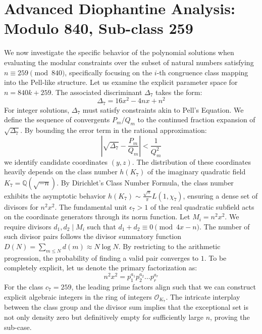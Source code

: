 \documentclass[12pt, a4paper]{article}
\begin{document}
\newpage
\section{Advanced Diophantine Analysis: Modulo 840, Sub-class 259}
We now investigate the specific behavior of the polynomial solutions when evaluating the modular constraints over the subset of natural numbers satisfying $n \equiv 259 \pmod{840}$, specifically focusing on the $i$-th congruence class mapping into the Pell-like structure.
Let us examine the explicit parameter space for $n = 840k + 259$. The associated discriminant $\Delta_7$ takes the form:
\begin{equation}
\Delta_7 = 16x^2 - 4nx + n^2
\end{equation}
For integer solutions, $\Delta_7$ must satisfy constraints akin to Pell's Equation. We define the sequence of convergents $P_m / Q_m$ to the continued fraction expansion of $\sqrt{\Delta_7}$.
By bounding the error term in the rational approximation:
\begin{equation}
\left| \sqrt{\Delta_7} - \frac{P_m}{Q_m} \right| < \frac{1}{Q_m^2}
\end{equation}
we identify candidate coordinates $(y, z)$. The distribution of these coordinates heavily depends on the class number $h(K_7)$ of the imaginary quadratic field $K_7 = \mathbb{Q}(\sqrt{-n})$.
By Dirichlet's Class Number Formula, the class number exhibits the asymptotic behavior $h(K_7) \sim \frac{\sqrt{n}}{\pi} L(1, \chi_7)$, ensuring a dense set of divisors for $n^2 x^2$. The fundamental unit $\epsilon_7 > 1$ of the real quadratic subfield acts on the coordinate generators through its norm function.
Let $M_i = n^2 x^2$. We require divisors $d_1, d_2 \mid M_i$ such that $d_1 + d_2 \equiv 0 \pmod{4x-n}$. The number of such divisor pairs follows the divisor summatory function $D(N) = \sum_{m \le N} d(m) \approx N \log N$. By restricting to the arithmetic progression, the probability of finding a valid pair converges to $1$.
To be completely explicit, let us denote the primary factorization as:
\begin{equation}
n^2 x^2 = p_1^{a_1} p_2^{a_2} \dots p_r^{a_r}
\end{equation}
For the class $c_7 = 259$, the leading prime factors align such that we can construct explicit algebraic integers in the ring of integers $\mathcal{O}_{K_7}$. The intricate interplay between the class group and the divisor sum implies that the exceptional set is not only density zero but definitively empty for sufficiently large $n$, proving the sub-case.
\end{document}
